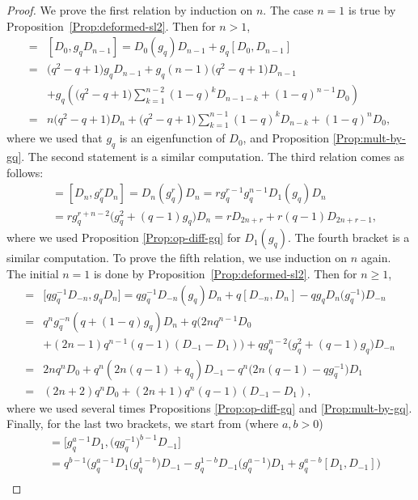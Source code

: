 \documentclass[10pt,a4paper]{amsart}
\numberwithin{equation}{section}
\begin{document}
\begin{proof}
We prove the first relation by induction on $n$. The case $n=1$ is true by Proposition~\ref{Prop:deformed-sl2}. Then for $n>1$,
\begin{align*}
[D_0,D_n] ={}& [D_0,g_qD_{n-1}] = D_0(g_q)D_{n-1}+g_q[D_0,D_{n-1}]\\
={}& \big(q^2-q+1\big)g_qD_{n-1}+g_q(n-1)\big(q^2-q+1\big)D_{n-1} \\
& +g_q\left(\big(q^2-q+1\big)\displaystyle\sum_{k=1}^{n-2}(1-q)^kD_{n-1-k}+(1-q)^{n-1}D_0\right)\\
={}&n\big(q^2-q+1\big)D_n+\big(q^2-q+1\big)\displaystyle\sum_{k=1}^{n-1}(1-q)^kD_{n-k}+(1-q)^nD_0,
\end{align*}
where we used that $g_q$ is an eigenfunction of $D_0$, and Proposition \ref{Prop:mult-by-gq}.
The second statement is a similar computation.
The third relation comes as follows:
\begin{align*}
[D_n,D_{n+r}]&=[D_n,g_q^rD_n]=D_n(g_q^r)D_n=rg_q^{r-1}g_q^{n-1}D_1(g_q)D_n\\
&=rg_q^{r+n-2}\big(g_q^2+(q-1)g_q\big)D_n = rD_{2n+r}+r(q-1)D_{2n+r-1},
\end{align*}
where we used Proposition \ref{Prop:op-diff-gq} for $D_1(g_q)$. The fourth bracket is a similar computation.
To prove the fifth relation, we use induction on $n$ again. The initial $n=1$ is done by Proposition~\ref{Prop:deformed-sl2}. Then for $n\geq 1$,
\begin{align*}
[D_{-n-1},D_{n+1}]={}& \big[qg_q^{-1}D_{-n},g_qD_n\big]=qg_q^{-1}D_{-n}(g_q)D_n+q[D_{-n},D_n]-qg_qD_n\big(g_q^{-1}\big)D_{-n}\\
={}& q^ng_q^{-n}(q+(1- q)g_q)D_n+q\big(2nq^{n-1}D_0\\
&+(2n- 1)q^{n-1}(q-1)(D_{-1}-D_1)\big) +qg_q^{n-2}\big(g_q^2+(q-1)g_q\big)D_{-n}\\
={}& 2nq^nD_0+q^n(2n(q-1)+q_q)D_{-1}-q^n\big(2n(q-1)-qg_q^{-1}\big)D_1\\
={}&(2n+2)q^nD_0+(2n+1)q^n(q-1)(D_{-1}-D_1),
\end{align*}
where we used several times Propositions \ref{Prop:op-diff-gq} and \ref{Prop:mult-by-gq}. Finally, for the last two brackets, we start from (where $a,b>0$)
\begin{align}
[D_a,D_{-b}]&=\big[g_q^{a-1}D_1,\big(qg_q^{-1}\big)^{b-1}D_{-1}\big] \nonumber\\
&=q^{b-1}\big(g_q^{a-1}D_1\big(g_q^{1-b}\big)D_{-1}-g_q^{1-b}D_{-1}\big(g_q^{a-1}\big)D_1+g_q^{a-b}[D_1,D_{-1}]\big)\nonumber\\

\end{align}
\end{proof}
\end{document}
